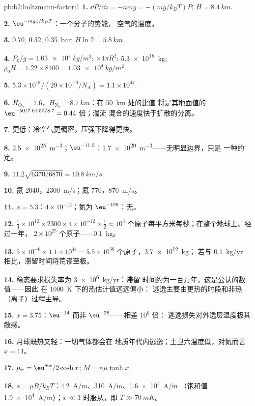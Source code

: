 \begin{solution}{pb:b2:boltzmann-factor:1}
\textbf{1.} $\dd P/\dd z = -nmg = -(mg/k_BT)P$; $H = \qty{8.4}{km}$.

\textbf{2.} $\eu^{-mgz/k_BT}$：一个分子的势能，
空气的温度。

\textbf{3.} \qty{0.70}{}, \qty{0.52}{}, \qty{0.35}{bar}; $H\ln 2 = \qty{5.8}{km}$.

\textbf{4.} $P_0/g = \qty{1.03e4}{kg/m^2}$; $\times 4\pi R^2$: \qty{5.3e18}{kg}; $\rho_0H =
1.22 \times 8400 = \qty{1.03e4}{kg/m^2}$.

\textbf{5.} $5.3 \times 10^{18}/(29 \times 10^{-3}/N_A) = 1.1 \times 10^{44}$.

\textbf{6.} $H_{\text{O}_2} = 7.6$，$H_{\text{N}_2} = \qty{8.7}{km}$：在 \qty{50}{km} 处的比值
将是其地面值的 $\eu^{-50/7.6 + 50/8.7} = 0.44$ 倍；湍流
混合的速度快于扩散的分离。

\textbf{7.} 更低：冷空气更稠密，压强下降得更快。

\textbf{8.} \qty{2.5e25}{m^{-3}}；$\eu^{-11.9}$：\qty{1.7e20}{m^{-3}}——无明显边界，只是
一种约定。

\textbf{9.} $11.2\sqrt{6370/6870} = \qty{10.8}{km/s}$.

\textbf{10.} 氦 \qty{2040}{}，\qty{2300}{m/s}；氮 \qty{770}{}，\qty{870}{m/s}。

\textbf{11.} $x = 5.3$：$4 \times 10^{-12}$；氮为 $\eu^{-196}$：无。

\textbf{12.} $\tfrac14 \times 10^{12} \times 2300 \times 4 \times 10^{-12} \times \tfrac12 \approx
10^3$ 个原子每平方米每秒；在整个地球上、经过一年，
$2 \times 10^{25}$ 个原子——\qty{0.1}{kg}。

\textbf{13.} $5 \times 10^{-6} \times 1.1 \times 10^{44} = 5.5 \times 10^{38}$ 个原子，\qty{3.7e12}{kg}；
若与 \qty{0.1}{kg/yr} 相比，滞留时间将荒谬至极。

\textbf{14.} 稳态要求损失率为 \qty{3e6}{kg/yr}：滞留
时间约为一百万年，这是公认的数值——因此
在 \qty{1000}{K} 下的热估计值远远偏小：
逃逸主要由更热的时段和非热（离子）过程主导。

\textbf{15.} $x = 3.75$：$\eu^{-14}$ 而非 $\eu^{-28}$——相差 $10^6$ 倍：
逃逸损失对外逸层温度极其敏感。

\textbf{16.} 月球既热又轻：一切气体都会在
地质年代内逃逸；土卫六温度低，对氮而言 $x = 11$。

\textbf{17.} $p_\pm = \eu^{\pm x}/2\cosh x$; $M = n\mu\tanh x$.

\textbf{18.} $x = \mu B/k_BT$：\qty{4.2}{A/m}、\qty{310}{A/m}、\qty{1.6e4}{A/m}
（饱和值 \qty{1.9e4}{A/m}）；$x \ll 1$ 时服从，即 $T \gg \qty{70}{mK}$。


\end{solution}
